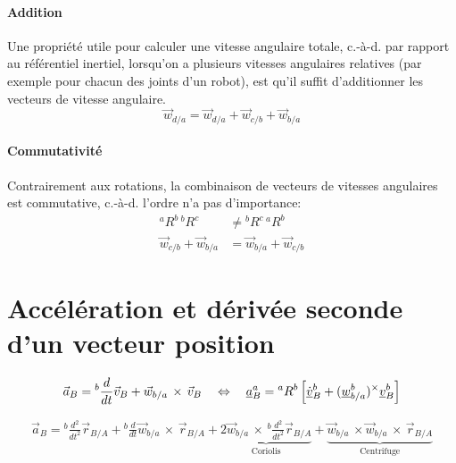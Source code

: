 \paragraph{Addition} Une propriété utile pour calculer une vitesse angulaire totale, c.-à-d. par rapport au référentiel inertiel, lorsqu'on a plusieurs vitesses angulaires relatives (par exemple pour chacun des joints d'un robot), est qu'il suffit d'additionner les vecteurs de vitesse angulaire.
\begin{equation}
	\vec{w}_{d/a} = \vec{w}_{d/a}  + \vec{w}_{c/b} + \vec{w}_{b/a}
	\label{eq:angspeedadd}
\end{equation}
\paragraph{Commutativité} Contrairement aux rotations, la combinaison de vecteurs de vitesses angulaires est commutative, c.-à-d. l'ordre n'a pas d'importance:
\begin{align}
{}^aR^b \, {}^bR^c  &\neq {}^bR^c \, {}^aR^b  \\
\vec{w}_{c/b} + \vec{w}_{b/a}  &= \vec{w}_{b/a}  + \vec{w}_{c/b}
\end{align}



\newpage
\section{Accélération et dérivée seconde d'un vecteur position}
\label{sec:acc}



\begin{align}
	\vec{a}_{B} = {}^{b}\frac{d}{dt} \vec{v}_{B} +  \vec{w}_{b/a} \, \times \, \vec{v}_{B}
	\quad \Leftrightarrow \quad
	\underline{a}_{B}^{a} = {}^{a}R^b \left[ \underline{\dot{v}}^b_{B} +  (\underline{w}_{b/a}^b)^{\times} \underline{v}^b_{B}  \right]
\end{align}

\begin{align}
	\vec{a}_{B} =
	{}^{b}\frac{d^2}{dt^2} \vec{r}_{B/A}
	+
	{}^{b}\frac{d}{dt} \vec{w}_{b/a} \, \times \, \vec{r}_{B/A}
	+
	\underbrace{
		2 \vec{w}_{b/a} \, \times \, {}^{b}\frac{d^2}{dt^2} \vec{r}_{B/A}
	}_{\text{Coriolis}}
	+
	\underbrace{
		\vec{w}_{b/a} \, \times \vec{w}_{b/a} \, \times \,
		\vec{r}_{B/A}
	}_{\text{Centrifuge}}
\end{align}

